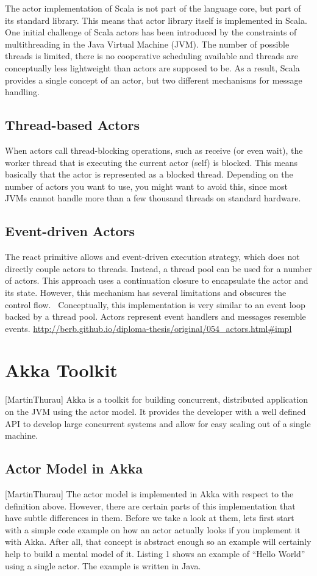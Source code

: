 The actor implementation of Scala is not part of the language core, but part of its standard library. This means that actor library itself is implemented in Scala. One initial challenge of Scala actors has been introduced by the constraints of multithreading in the Java Virtual Machine (JVM). The number of possible threads is limited, there is no cooperative scheduling available and threads are conceptually less lightweight than actors are supposed to be. As a result, Scala provides a single concept of an actor, but two different mechanisms for message handling.~\parencite{Haller}

\subsection*{Thread-based Actors}
When actors call thread-blocking operations, such as receive (or even wait), the worker thread that is executing the current actor (self) is blocked. This means basically that the actor is represented as a blocked thread. Depending on the number of actors you want to use, you might want to avoid this, since most JVMs cannot handle more than a few thousand threads on standard hardware.

\subsection*{Event-driven Actors}
The react primitive allows and event-driven execution strategy, which does not directly couple actors to threads. Instead, a thread pool can be used for a number of actors. This approach uses a continuation closure to encapsulate the actor and its state. However, this mechanism has several limitations and obscures the control flow.~\cite{Haller} Conceptually, this implementation is very similar to an event loop backed by a thread pool. Actors represent event handlers and messages resemble events. \url{http://berb.github.io/diploma-thesis/original/054_actors.html#impl}

\section{Akka Toolkit}[MartinThurau]
Akka is a toolkit for building concurrent, distributed application on the JVM using the actor model. It provides the developer with a well defined API to develop large concurrent systems and allow for easy scaling out of a single machine.
  \subsection{Actor Model in Akka}[MartinThurau]
The actor model is implemented in Akka with respect to the definition above. However, there are certain parts of this implementation that have subtle differences in them. Before we take a look at them, lets first start with a simple code example on how an actor actually looks if you implement it with Akka. After all, that concept is abstract enough so an example will certainly help to build a mental model of it. Listing 1 shows an example of “Hello World” using a single actor. The example is written in Java.

